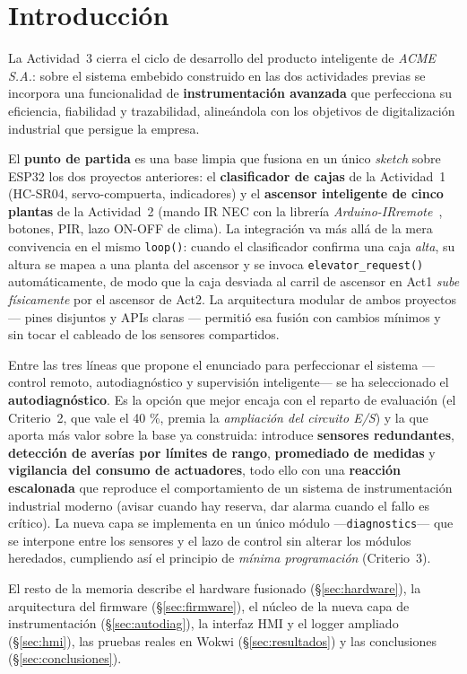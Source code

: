 \section{Introducción}
\label{sec:intro}

La Actividad~3 cierra el ciclo de desarrollo del producto inteligente de
\emph{ACME\,S.A.}: sobre el sistema embebido construido en las dos actividades
previas se incorpora una funcionalidad de \textbf{instrumentación avanzada}
que perfecciona su eficiencia, fiabilidad y trazabilidad, alineándola con los
objetivos de digitalización industrial que persigue la empresa.

El \textbf{punto de partida} es una base limpia que fusiona en un único
\emph{sketch} sobre ESP32 los dos proyectos anteriores: el \textbf{clasificador
de cajas} de la Actividad~1 (HC-SR04, servo-compuerta, indicadores) y el
\textbf{ascensor inteligente de cinco plantas} de la Actividad~2 (mando IR
NEC con la librería \emph{Arduino-IRremote}~\cite{irremote_gh}, botones, PIR,
lazo ON-OFF de clima). La integración va más allá de la mera
convivencia en el mismo \texttt{loop()}: cuando el clasificador confirma una
caja \emph{alta}, su altura se mapea a una planta del ascensor y se invoca
\texttt{elevator\_request()} automáticamente, de modo que la caja desviada al
carril de ascensor en Act1 \emph{sube físicamente} por el ascensor de Act2. La
arquitectura modular de ambos proyectos --- pines disjuntos y APIs claras ---
permitió esa fusión con cambios mínimos y sin tocar el cableado de los
sensores compartidos.

Entre las tres líneas que propone el enunciado para perfeccionar el sistema
---control remoto, autodiagnóstico y supervisión inteligente--- se ha
seleccionado el \textbf{autodiagnóstico}. Es la opción que mejor encaja con
el reparto de evaluación (el Criterio~2, que vale el 40 \%, premia
la \emph{ampliación del circuito E/S}) y la que aporta más valor sobre la base
ya construida: introduce \textbf{sensores redundantes}, \textbf{detección de
averías por límites de rango}, \textbf{promediado de medidas} y
\textbf{vigilancia del consumo de actuadores}, todo ello con una
\textbf{reacción escalonada} que reproduce el comportamiento de un sistema de
instrumentación industrial moderno (avisar cuando hay reserva, dar alarma
cuando el fallo es crítico). La nueva capa se implementa en un único módulo
---\texttt{diagnostics}--- que se interpone entre los sensores y el lazo de
control sin alterar los módulos heredados, cumpliendo así el principio de
\emph{mínima programación} (Criterio~3).

El resto de la memoria describe el hardware fusionado (§\ref{sec:hardware}),
la arquitectura del firmware (§\ref{sec:firmware}), el núcleo de la nueva
capa de instrumentación (§\ref{sec:autodiag}), la interfaz HMI y el logger
ampliado (§\ref{sec:hmi}), las pruebas reales en Wokwi (§\ref{sec:resultados})
y las conclusiones (§\ref{sec:conclusiones}).
